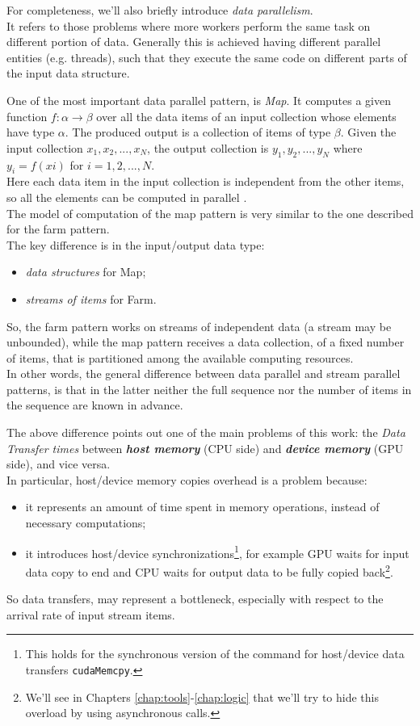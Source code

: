 	For completeness, we'll also briefly introduce \textit{data parallelism}.\\
	It refers to those problems where more workers perform the same task on different portion of data.
	Generally this is achieved having different parallel entities (e.g. threads), such that they execute the same code on different parts of the input data structure\cite{parpattbench}.
	
	One of the most important data parallel pattern, is \textit{Map}. It computes a given function \(f:\alpha\rightarrow\beta\) over all the  data items of an input collection whose elements have type \(\alpha\). The  produced output is a collection of items of type \(\beta\).  Given the input collection \(x_{1},x_{2},...,x_{N}\), the output collection is \(y_{1},y_{2},...,y_{N}\) where \(y_{i}=f(xi)\) for \(i=1,2,...,N\).\\
	Here each data item in the input collection is independent from the other items, so all the elements can be computed in parallel \cite{parpattbench,spm}.\\
	
	The model of computation of the map pattern is very similar to the one described for the farm pattern.\\
	The key difference is in the input/output data type:
	\begin{itemize}			
		\item \textit{data structures} for Map;
		\item \textit{streams of items} for Farm.
	\end{itemize}
	So, the farm pattern works on streams of independent data (a stream may be unbounded), while the map pattern receives a data collection, of a fixed number of items, that is partitioned among the available computing resources\cite{spm}.\\
	In other words, the general difference between data parallel and stream parallel patterns, is that in the latter neither the full sequence nor the number of items in the sequence are known in advance\cite{streamparpatt}.

	The above difference points out one of the main problems of this work: the \textit{Data Transfer times} between  \textit{\textbf{host memory}} (CPU side) and \textit{\textbf{device memory}} (GPU side), and vice versa.\\ 
	In particular, host/device memory copies  overhead is a problem because:
	\begin{itemize}
		\item it represents an amount of time spent in memory operations, instead of necessary computations;
		\item it introduces host/device synchronizations\footnote{This holds for the synchronous version of the command for host/device data transfers \texttt{cudaMemcpy}.}, for example GPU waits for input data copy to end and CPU waits for output data to be fully copied back\footnote{We'll see in Chapters \ref{chap:tools}-\ref{chap:logic} that we'll try to hide this overload by using asynchronous calls.}.
	\end{itemize}
	So data transfers, may represent a bottleneck, especially with respect to the arrival rate of input stream items.
	
